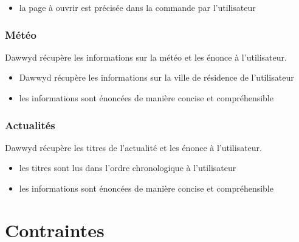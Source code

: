 \documentclass[12pt]{article}
\begin{document}
    \begin{itemize}
        \item la page à ouvrir est précisée dans la commande par l'utilisateur
    \end{itemize}

    \subsubsection{Météo}
    Dawwyd récupère les informations sur la météo et les énonce à l'utilisateur.

    \begin{itemize}
        \item Dawwyd récupère les informations sur la ville de résidence de l'utilisateur
        \item les informations sont énoncées de manière concise et compréhensible
    \end{itemize}

    \subsubsection{Actualités}
    Dawwyd récupère les titres de l'actualité et les énonce à l'utilisateur.

    \begin{itemize}
        \item les titres sont lus dans l'ordre chronologique à l'utilisateur
        \item les informations sont énoncées de manière concise et compréhensible
    \end{itemize}

    \section{Contraintes}
\end{document}
